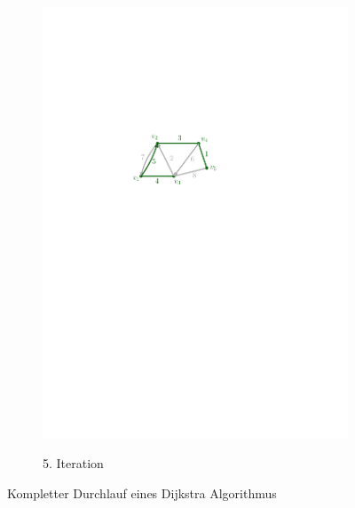 \begin{figure}[h]
\begin{subfigure}{0.32\textwidth}
\includegraphics[width = \textwidth]{../media/dijkstra5.pdf} \\
\caption{5. Iteration}
\vspace{0.5cm}
\label{fig:dijkstra5}
\end{subfigure}
\caption{Kompletter Durchlauf eines Dijkstra Algorithmus}
\label{dijkstraIterations}
\end{figure}

